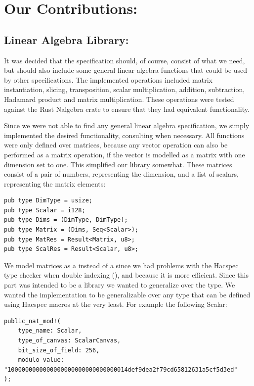 \documentclass{article}
\newcommand*\ttvar[1]{\texttt{\expandafter\dottvar\detokenize{#1}\relax}}
\newcommand*\dottvar[1]{\ifx\relax#1\else
  \expandafter\ifx\string_#1\string_\allowbreak\else#1\fi
  \expandafter\dottvar\fi}
\begin{document}
\newpage

\section{Our Contributions:} \label{our-contributions}

\subsection{Linear Algebra Library:} \label{linear-algebra-library}
It was decided that the specification should, of course, consist of what
we need, but should also include some general linear algebra functions 
that could be used by other specifications. The implemented operations 
included matrix instantiation, slicing, transposition, scalar 
multiplication, addition, subtraction, Hadamard product and matrix 
multiplication. These operations were tested against the Rust Nalgebra 
crate \cite{nalgebra} to ensure that they had equivalent functionality.

Since we were not able to find any general linear algebra
specification, we simply implemented the desired functionality,
consulting \cite{linear-algebra} when necessary. All functions were
only defined over matrices, because any vector operation can also
be performed as a matrix operation, if the vector is modelled as a
matrix with one dimension set to one. This simplified our library
somewhat. These matrices consist of a pair of numbers, representing
the dimension, and a list of scalars, representing the matrix elements:

\begin{lstlisting}
pub type DimType = usize;
pub type Scalar = i128;
pub type Dims = (DimType, DimType);
pub type Matrix = (Dims, Seq<Scalar>);
pub type MatRes = Result<Matrix, u8>;
pub type ScalRes = Result<Scalar, u8>;
\end{lstlisting}

We model matrices as a \ttvar{Seq<Scalar>} instead of a
\ttvar{Seq<Seq<Scalar>>} since we had problems with the Hacspec type
checker when double indexing (\ttvar{list[i][j]}), and because it is
more efficient. Since this part was intended to be a library we wanted
to generalize over the \ttvar{Scalar} type. We wanted the implementation
to be generalizable over any type that can be defined using Hacspec
macros at the very least. For example the following Scalar:

\begin{lstlisting}
public_nat_mod!(
	type_name: Scalar,
	type_of_canvas: ScalarCanvas,
	bit_size_of_field: 256,
	modulo_value: "1000000000000000000000000000000014def9dea2f79cd65812631a5cf5d3ed"
);
\end{lstlisting}
\end{document}
